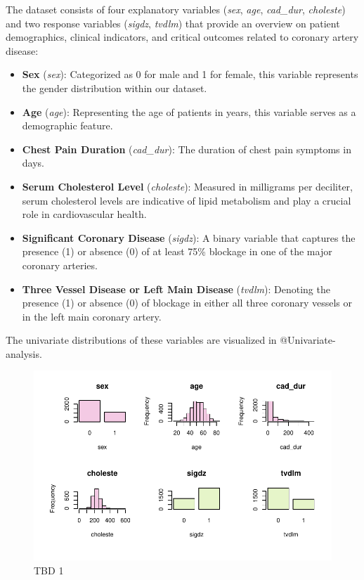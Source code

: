 \documentclass[
  letterpaper,
  DIV=11,
  numbers=noendperiod]{scrartcl}
\begin{document}
The dataset consists of four explanatory variables (\emph{sex},
\emph{age}, \emph{cad\_dur}, \emph{choleste}) and two response variables
(\emph{sigdz}, \emph{tvdlm}) that provide an overview on patient
demographics, clinical indicators, and critical outcomes related to
coronary artery disease:

\begin{itemize}
\item
  \textbf{Sex} (\emph{sex}): Categorized as 0 for male and 1 for female,
  this variable represents the gender distribution within our dataset.
\item
  \textbf{Age} (\emph{age}): Representing the age of patients in years,
  this variable serves as a demographic feature.
\item
  \textbf{Chest Pain Duration} (\emph{cad\_dur}): The duration of chest
  pain symptoms in days.
\item
  \textbf{Serum Cholesterol Level} (\emph{choleste}): Measured in
  milligrams per deciliter, serum cholesterol levels are indicative of
  lipid metabolism and play a crucial role in cardiovascular health.
\item
  \textbf{Significant Coronary Disease} (\emph{sigdz}): A binary
  variable that captures the presence (1) or absence (0) of at least
  75\% blockage in one of the major coronary arteries.
\item
  \textbf{Three Vessel Disease or Left Main Disease} (\emph{tvdlm}):
  Denoting the presence (1) or absence (0) of blockage in either all
  three coronary vessels or in the left main coronary artery.
\end{itemize}

The univariate distributions of these variables are visualized in
@Univariate-analysis.

\begin{figure}

{\centering \includegraphics{project_final_files/figure-pdf/Univariate-analysis-1.pdf}

}

\caption{TBD 1}

\end{figure}
\end{document}
